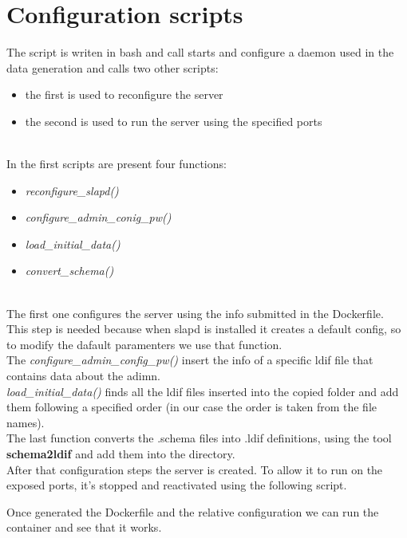 \section{Configuration scripts}
The script is writen in bash and call starts and configure a daemon used in the data generation and calls two other scripts:
\begin{itemize}
    \item the first is used to reconfigure the server
    \item the second is used to run the server using the specified ports
\end{itemize}
\\
In the first scripts are present four functions:\\
\begin{itemize}
    \item \textit{reconfigure\_slapd()}
    \item \textit{configure\_admin\_conig\_pw()}
    \item \textit{load\_initial\_data()}
    \item \textit{convert\_schema()}
\end{itemize}
\\
The first one configures the server using the info submitted in the Dockerfile. This step is needed because when slapd is installed it creates a default config, so to modify the dafault paramenters we use that function.
\\
The \textit{configure\_admin\_config\_pw()} insert the info of a specific ldif file that contains data about the adimn.
\\
\textit{load\_initial\_data()} finds all the ldif files inserted into the copied folder and add them following a specified order (in our case the order is taken from the file names).
\\
The last function converts the .schema files into .ldif definitions, using the tool \textbf{schema2ldif} \cite{schema2ldif} and add them into the directory.
\\
After that configuration steps the server is created. To allow it to run on the exposed ports, it's stopped and reactivated using the following script.
\begin{mdframed}[backgroundcolor=back]

\end{mdframed}
Once generated the Dockerfile and the relative configuration we can run the container and see that it works.
